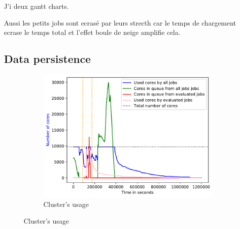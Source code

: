 \documentclass[a4paper]{article}
\begin{document}
J'i deux gantt charts.

Aussi les petits jobs sont ecrasé par leurs strecth car le temps de chargement ecrase le temps total et l'effet boule de neige amplifie cela.

\subsection{Data persistence}

\begin{figure}[H]\centering
\begin{subfigure}[b]{0.4\linewidth}\centering\includegraphics[width=1\linewidth]{MBSS/plot/2022-01-17->2022-01-17_V9271_Fcfs_Used_nodes_450_128_32_256_4_1024.pdf}\caption{Cluster's usage}\end{subfigure}

\end{figure}
\end{document}
